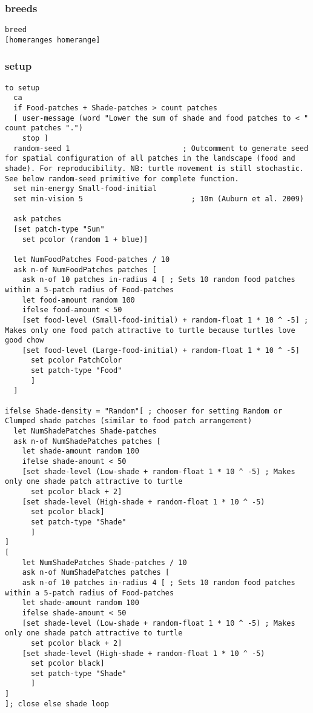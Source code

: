 \documentclass[]{article}
\begin{document}
\subsubsection{breeds}\label{breeds}

\begin{verbatim}
breed
[homeranges homerange]
\end{verbatim}

\subsubsection{setup}\label{setup}

\begin{verbatim}
to setup
  ca
  if Food-patches + Shade-patches > count patches
  [ user-message (word "Lower the sum of shade and food patches to < " count patches ".")
    stop ]
  random-seed 1                          ; Outcomment to generate seed for spatial configuration of all patches in the landscape (food and shade). For reproducibility. NB: turtle movement is still stochastic. See below random-seed primitive for complete function.
  set min-energy Small-food-initial
  set min-vision 5                         ; 10m (Auburn et al. 2009)

  ask patches
  [set patch-type "Sun"
    set pcolor (random 1 + blue)]

  let NumFoodPatches Food-patches / 10
  ask n-of NumFoodPatches patches [
    ask n-of 10 patches in-radius 4 [ ; Sets 10 random food patches within a 5-patch radius of Food-patches
    let food-amount random 100
    ifelse food-amount < 50
    [set food-level (Small-food-initial) + random-float 1 * 10 ^ -5] ; Makes only one food patch attractive to turtle because turtles love good chow
    [set food-level (Large-food-initial) + random-float 1 * 10 ^ -5]
      set pcolor PatchColor
      set patch-type "Food"
      ]
  ]

ifelse Shade-density = "Random"[ ; chooser for setting Random or Clumped shade patches (similar to food patch arrangement)
  let NumShadePatches Shade-patches
  ask n-of NumShadePatches patches [
    let shade-amount random 100
    ifelse shade-amount < 50
    [set shade-level (Low-shade + random-float 1 * 10 ^ -5) ; Makes only one shade patch attractive to turtle
      set pcolor black + 2]
    [set shade-level (High-shade + random-float 1 * 10 ^ -5)
      set pcolor black]
      set patch-type "Shade"
      ]
]
[
    let NumShadePatches Shade-patches / 10
    ask n-of NumShadePatches patches [
    ask n-of 10 patches in-radius 4 [ ; Sets 10 random food patches within a 5-patch radius of Food-patches
    let shade-amount random 100
    ifelse shade-amount < 50
    [set shade-level (Low-shade + random-float 1 * 10 ^ -5) ; Makes only one shade patch attractive to turtle
      set pcolor black + 2]
    [set shade-level (High-shade + random-float 1 * 10 ^ -5)
      set pcolor black]
      set patch-type "Shade"
      ]
]
]; close else shade loop


\end{verbatim}
\end{document}
